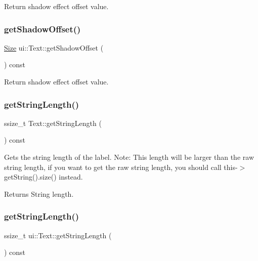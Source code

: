 Return shadow effect offset value. \mbox{\label{classui_1_1Text_ae54b6b1e10f9faed2f90f22f93583afa}} 
\subsubsection{\texorpdfstring{get\+Shadow\+Offset()}{getShadowOffset()}\hspace{0.1cm}{\footnotesize\ttfamily [2/2]}}
{\footnotesize\ttfamily \hyperlink{classSize}{Size} ui\+::\+Text\+::get\+Shadow\+Offset (\begin{DoxyParamCaption}{ }\end{DoxyParamCaption}) const}

Return shadow effect offset value. \mbox{\label{classui_1_1Text_ae73702da851f182ad223f8e091d5a2cf}} 
\subsubsection{\texorpdfstring{get\+String\+Length()}{getStringLength()}\hspace{0.1cm}{\footnotesize\ttfamily [1/2]}}
{\footnotesize\ttfamily ssize\+\_\+t Text\+::get\+String\+Length (\begin{DoxyParamCaption}{ }\end{DoxyParamCaption}) const}

Gets the string length of the label. Note\+: This length will be larger than the raw string length, if you want to get the raw string length, you should call this-\/$>$get\+String().size() instead.

\begin{DoxyReturn}{Returns}
String length. 
\end{DoxyReturn}
\mbox{\label{classui_1_1Text_aa92e49b93209c7277f23c11ced33c2c1}} 
\subsubsection{\texorpdfstring{get\+String\+Length()}{getStringLength()}\hspace{0.1cm}{\footnotesize\ttfamily [2/2]}}
{\footnotesize\ttfamily ssize\+\_\+t ui\+::\+Text\+::get\+String\+Length (\begin{DoxyParamCaption}{ }\end{DoxyParamCaption}) const}

